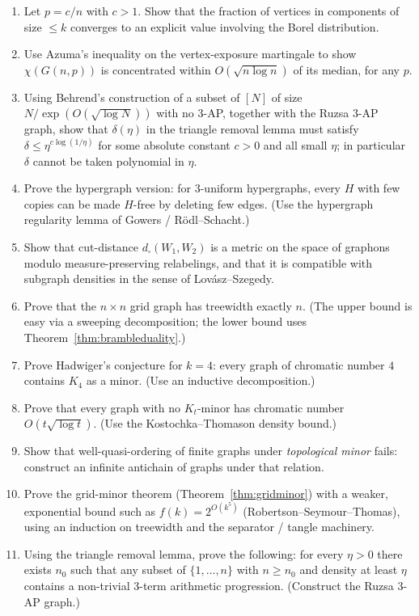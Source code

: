 \documentclass{article}
\theoremstyle{definition}
\begin{document}
\begin{enumerate}[resume]
\item Let $p = c/n$ with $c > 1$. Show that the fraction of vertices in
components of size $\le k$ converges to an explicit value involving
the Borel distribution.

\item Use Azuma's inequality on the vertex-exposure martingale to show
$\chi(G(n, p))$ is concentrated within $O(\sqrt{n \log n})$ of its
median, for any $p$.

\item Using Behrend's construction of a subset of $[N]$ of size
$N/\exp(O(\sqrt{\log N}))$ with no 3-AP, together with the Ruzsa $3$-AP
graph, show that $\delta(\eta)$ in the triangle removal lemma must satisfy
$\delta \le \eta^{c \log(1/\eta)}$ for some absolute constant $c > 0$ and all
small $\eta$; in particular $\delta$ cannot be taken polynomial in $\eta$.

\item Prove the hypergraph version: for $3$-uniform hypergraphs, every
$H$ with few copies can be made $H$-free by deleting few edges.
(Use the hypergraph regularity lemma of Gowers / R\"odl--Schacht.)

\item Show that cut-distance $d_\square(W_1, W_2)$ is a metric on the space
of graphons modulo measure-preserving relabelings, and that it is
compatible with subgraph densities in the sense of Lov\'asz--Szegedy.

\item Prove that the $n \times n$ grid graph has treewidth exactly $n$.
(The upper bound is easy via a sweeping decomposition; the lower
bound uses Theorem~\ref{thm:brambleduality}.)

\item Prove Hadwiger's conjecture for $k = 4$: every graph of chromatic
number $4$ contains $K_4$ as a minor. (Use an inductive
decomposition.)

\item Prove that every graph with no $K_t$-minor has chromatic number
$O(t \sqrt{\log t})$. (Use the Kostochka--Thomason density bound.)

\item Show that well-quasi-ordering of finite graphs under \emph{topological
minor} fails: construct an infinite antichain of graphs under that
relation.

\item Prove the grid-minor theorem (Theorem~\ref{thm:gridminor}) with a
weaker, exponential bound such as $f(k) = 2^{O(k^5)}$
(Robertson--Seymour--Thomas), using an induction on treewidth
and the separator / tangle machinery.


\item Using the triangle removal lemma, prove the following: for every
$\eta > 0$ there exists $n_0$ such that any subset of
$\{1, \dots, n\}$ with $n \ge n_0$ and density at least $\eta$ contains
a non-trivial $3$-term arithmetic progression. (Construct the Ruzsa $3$-AP graph.)
\end{enumerate}
\end{document}
